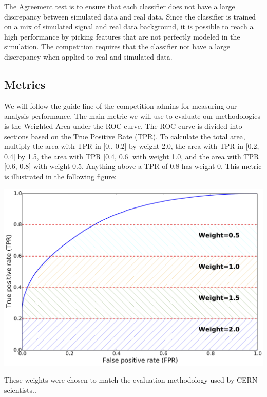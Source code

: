 \documentclass{article} %
\begin{document}
The Agreement test is to ensure that each classifier does not have a large discrepancy between simulated data and real data. Since the classifier is trained on a mix of simulated signal and real data background, it is possible to reach a high performance by picking features that are not perfectly modeled in the simulation. The competition requires that the classifier not have a large discrepancy when applied to real and simulated data. \cite{}
\subsection*{Metrics}
We will follow the guide line of the competition admins for measuring our analysis performance. The main metric we will use to evaluate our methodologies is the Weighted Area under the ROC curve. The ROC curve is divided into sections based on the True Positive Rate (TPR). To calculate the total area, multiply the area with TPR in [0., 0.2] by weight 2.0, the area with TPR in [0.2, 0.4] by 1.5, the area with TPR [0.4, 0.6] with weight 1.0, and the area with TPR [0.6, 0.8] with weight 0.5. Anything above a TPR of 0.8 has weight 0. This metric is illustrated in the following figure:
\begin{center}
	\includegraphics[scale = .3]{roc_optimistic}
\end{center} 
These weights were chosen to match the evaluation methodology used by CERN scientists.\cite{kaggleComp}.

\printbibliography
\end{document}
